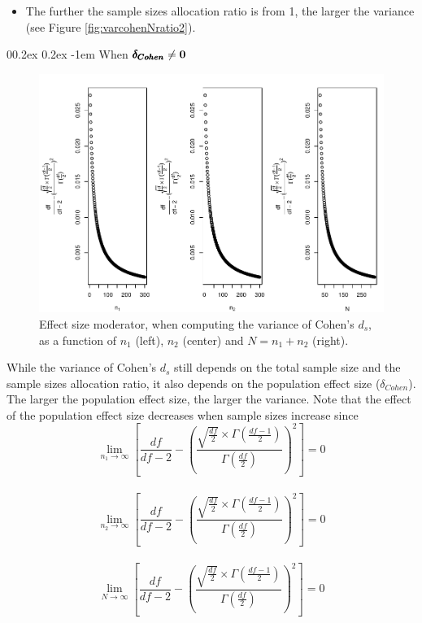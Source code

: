 \documentclass[
  english,
  man,mask]{apa6}
\makeatletter
\providecommand{\tightlist}{%
  \setlength{\itemsep}{0pt}\setlength{\parskip}{0pt}}
\let\oldparagraph\paragraph
\renewcommand{\paragraph}[1]{\oldparagraph{#1}\mbox{}}
\renewcommand{\paragraph}{\@startsection{paragraph}{4}{\parindent}%
  {0\baselineskip \@plus 0.2ex \@minus 0.2ex}%
  {-1em}%
  {\normalfont\normalsize\bfseries\itshape\typesectitle}}
\makeatother
\begin{document}
\begin{itemize}
\tightlist
\item
  The further the sample sizes allocation ratio is from 1, the larger the variance (see Figure \ref{fig:varcohenNratio2}).
\end{itemize}

\hypertarget{when-bf-pmbdelta_cohen-neq-0}{%
\paragraph{\texorpdfstring{When \(\bf \pmb{\delta_{Cohen}} \neq 0\)}{When \textbackslash bf \textbackslash pmb\{\textbackslash delta\_\{Cohen\}\} \textbackslash neq 0}}\label{when-bf-pmbdelta_cohen-neq-0}}

\begin{figure}
\centering
\includegraphics{Theoretical-Variance-of-all-estimators-as-a-function-of-population-parameters_files/figure-latex/ESmoderatorcohenNsize2-1.pdf}
\caption{\label{fig:ESmoderatorcohenNsize2}Effect size moderator, when computing the variance of Cohen's \(d_s\), as a function of \(n_1\) (left), \(n_2\) (center) and \(N=n_1+n_2\) (right).}
\end{figure}

While the variance of Cohen's \(d_s\) still depends on the total sample size and the sample sizes allocation ratio, it also depends on the population effect size (\(\delta_{Cohen}\)). The larger the population effect size, the larger the variance. Note that the effect of the population effect size decreases when sample sizes increase since
\[\lim_{n_1\rightarrow \infty}\left[\frac{df}{df-2} - \left( \frac{\sqrt{\frac{df}{2}} \times \Gamma \left(\frac{df-1}{2} \right)}{\Gamma \left( \frac{df}{2}\right)}\right)^2 \right]=0\]\\
\[\lim_{n_2\rightarrow \infty}\left[\frac{df}{df-2} - \left( \frac{\sqrt{\frac{df}{2}} \times \Gamma \left(\frac{df-1}{2} \right)}{\Gamma \left( \frac{df}{2}\right)}\right)^2 \right]=0\]\\
\[\lim_{N\rightarrow \infty}\left[\frac{df}{df-2} - \left( \frac{\sqrt{\frac{df}{2}} \times \Gamma \left(\frac{df-1}{2} \right)}{\Gamma \left( \frac{df}{2}\right)}\right)^2 \right]=0\]
\end{document}
